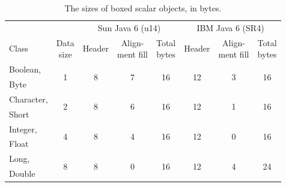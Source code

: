 \begin{table}
  \centering
	\begin{tabular}{lccccccc} \toprule
    	& & \multicolumn{3}{c}{Sun Java 6 (u14)} & \multicolumn{3}{c}{IBM Java 6
    	(SR4)} \\ \cmidrule(r){3-5} \cmidrule(l){6-8}
    	Class & \shortstack[c]{Data\\size} & Header & \shortstack{Align-\\ment
    	fill} & \shortstack[c]{Total\\bytes} & Header & \shortstack{Align-\\ment
    	fill} & \shortstack[c]{Total\\bytes}
    	\\ \midrule 
    	{Boolean,} & \multirow{2}{*}{1} & \multirow{2}{*}{8} & \multirow{2}{*}{7} &
    	\multirow{2}{*}{16} & \multirow{2}{*}{12} & \multirow{2}{*}{3} &
    	\multirow{2}{*}{16}
    	\\
    	Byte & \\ \addlinespace
    	Character, & \multirow{2}{*}{2} & \multirow{2}{*}{8} & \multirow{2}{*}{6}
    	& \multirow{2}{*}{16} & \multirow{2}{*}{12} & \multirow{2}{*}{1} &
    	\multirow{2}{*}{16} \\
    	Short & \\ \addlinespace
    	Integer, & \multirow{2}{*}{4} & \multirow{2}{*}{8} & \multirow{2}{*}{4} &
    	\multirow{2}{*}{16} & \multirow{2}{*}{12} & \multirow{2}{*}{0} &
    	\multirow{2}{*}{16}
    	\\
    	Float & \\ \addlinespace
    	Long, & \multirow{2}{*}{8} & \multirow{2}{*}{8} & \multirow{2}{*}{0} &
    	\multirow{2}{*}{16} & \multirow{2}{*}{12} & \multirow{2}{*}{4} &
    	\multirow{2}{*}{24} \\
    	Double & \\
		\bottomrule
	\end{tabular}
  \caption{The sizes of boxed scalar objects, in bytes.}
  \label{tab:boxed-scalar-sizes}
\end{table}
 
